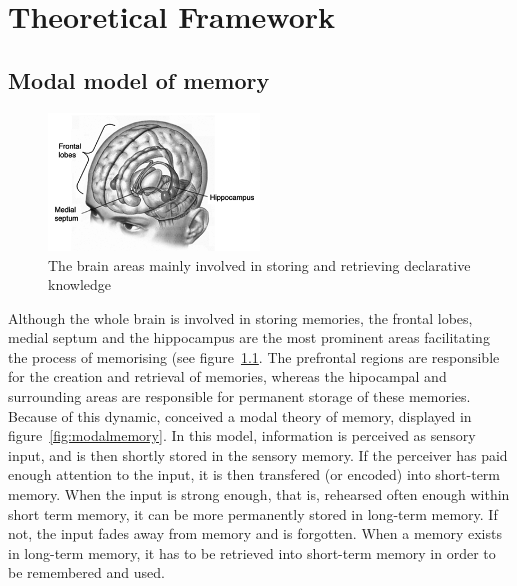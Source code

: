 \chapter{Theoretical Framework}




\section{Modal model of memory}

\begin{figure}
    \centering
    \includegraphics[width=0.5\textwidth]{img/brainareas.png}
    \caption{The brain areas mainly involved in storing and retrieving declarative knowledge \protect\cite{amnesia}}
    \label{fig:brainareas}
\end{figure}

Although the whole brain is involved in storing memories, the frontal lobes, medial septum and the hippocampus are the most prominent areas facilitating the process of memorising \cite{cognitivepsychology} (see figure~\ref{fig:brainareas}. The prefrontal regions are responsible for the creation and retrieval of memories, whereas the hipocampal and surrounding areas are responsible for permanent storage of these memories. Because of this dynamic,  conceived a modal theory of memory, displayed in figure~\ref{fig:modalmemory}. In this model, information is perceived as sensory input, and is then shortly stored in the sensory memory. If the perceiver has paid enough attention to the input, it is then transfered (or encoded) into short-term memory. When the input is strong enough, that is, rehearsed often enough within short term memory, it can be more permanently stored in long-term memory. If not, the input fades away from memory and is forgotten. When a memory exists in long-term memory, it has to be retrieved into short-term memory in order to be remembered and used.

